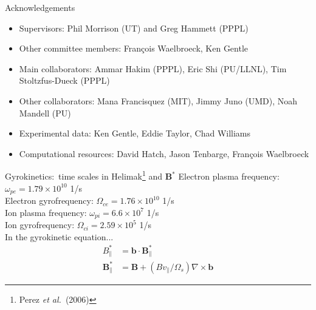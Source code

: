 \documentclass[12pt,table]{beamer}
\newcommand{\etal}{\emph{et al.}}
\begin{document}
\begin{frame}{Acknowledgements}
\begin{block}{}
    \begin{itemize}
        \item Supervisors: Phil Morrison (UT) and Greg Hammett (PPPL)
        \smallskip
        \item Other committee members: Fran\c cois Waelbroeck, Ken Gentle
        \smallskip
        \item Main collaborators: Ammar Hakim (PPPL), Eric Shi (PU/LLNL), Tim Stoltzfus-Dueck (PPPL)
        \smallskip
        \item Other collaborators: Mana Francisquez (MIT), Jimmy Juno (UMD),  Noah Mandell (PU)
        \smallskip
        \item Experimental data: Ken Gentle, Eddie Taylor, Chad Williams
        \smallskip
        \item Computational resources: David Hatch, Jason Tenbarge, Fran\c cois Waelbroeck
    \end{itemize}
    \end{block}
\end{frame}

\appendix
\begin{frame}{Gyrokinetics:~time scales in Helimak\footnote{Perez \etal\ (2006)} and $\bm{B}^*$}
    Electron plasma frequency: $\omega_{pe} = 1.79 \times 10^{10}$ 1/s\\
    Electron gyrofrequency: $\Omega_{ce} = 1.76 \times 10^{10}$ 1/s \\
    Ion plasma frequency: $\omega_{pi} = 6.6 \times 10^{7}$ 1/s\\
    Ion gyrofrequency: $\Omega_{ci} = 2.59 \times 10^{5}$ 1/s
    \\
    \vspace{1cm}
    In the gyrokinetic equation... 
    \begin{align}
    B_\parallel^* &= \bm{b} \cdot \bm{B}_\parallel^* \\ \bm{B}_\parallel^* &= \bm{B} +(Bv_\parallel/\Omega_s)\nabla \times \bm{b}
    \end{align}
\end{frame}
\end{document}
